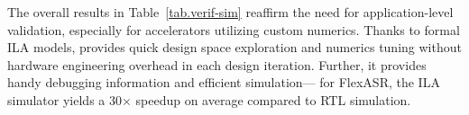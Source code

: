 
The overall results in Table~\ref{tab.verif-sim} reaffirm the need for application-level validation, especially for accelerators utilizing custom numerics.
%
%
%
Thanks to formal ILA models, \TLA provides quick design space exploration and numerics tuning without hardware engineering overhead %
in each design iteration.
%
%
Further, it provides handy debugging information and efficient simulation---%
%
for FlexASR, the ILA simulator yields a 30$\times$ speedup on average compared to RTL simulation.

